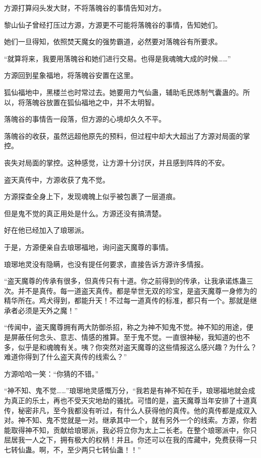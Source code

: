 \begin{this_body}
方源打算闷头发大财，不将落魄谷的事情告知对方。

黎山仙子曾经打压过方源，方源更不可能将落魄谷的事情，告知她们。

她们一旦得知，依照焚天魔女的强势霸道，必然要对落魄谷有所要求。

“就算将来，我要用落魄谷和她们进行交易。也得是我魂魄大成的时候……”

方源回到星象福地，将落魄谷安置在这里。

狐仙福地中，黑楼兰也时常过去。她要用力气仙蛊，辅助毛民炼制气囊蛊的。所以，将落魄谷放置在狐仙福地之中，并不太明智。

落魄谷的事情告一段落，但方源的心境却久久不平。

落魄谷的收获，虽然远超他原先的预料，但过程中却大大超出了方源对局面的掌控。

丧失对局面的掌控。这种感觉，让方源十分讨厌，并且感到阵阵的不安。

盗天真传中，方源收获了鬼不觉。

方源探查全身上下，发现魂魄上似乎被包裹了一层道痕。

但是鬼不觉的真正用处是什么。方源还没有搞清楚。

好在他已经加入了琅琊派。

于是，方源便亲自去琅琊福地，询问盗天魔尊的事情。

琅琊地灵没有隐瞒，也没有提任何要求，直接告诉方源许多情报。

“盗天魔尊的传承有很多，但真传只有十道。你之前得到的传承，让我承诺炼蛊三次。并不是真传。每一道盗天真传。都是举世无双的珍宝，是盗天魔尊一身修为的精华所在。鸡犬得到，都能升天！不过每一道真传的标准，都只有一个。那就是继承者必须是天外之魔！”

“传闻中，盗天魔尊拥有两大防御杀招，称之为神不知鬼不觉。神不知的用途，便是屏蔽任何念头、意志、情感的推算。至于鬼不觉。一直很神秘，我知道的也不多，似乎是和魂魄有关。咦？你突然对盗天魔尊的这些情报这么感兴趣？为什么？难道你得到了什么盗天真传的线索么？”

方源哈哈一笑：“你猜的不错。”

“神不知、鬼不觉……”琅琊地灵感慨万分，“我若是有神不知在手，琅琊福地就会成为真正的乐土，再也不受天灾地劫的骚扰。可惜的是，盗天魔尊当年安排了十道真传，秘密非凡，至今我都没有听过，有什么人获得他的真传。他的真传都是成双入对。神不知、鬼不觉就是一对。继承其中一个，就有另外一个的线索。方源，你若能取得神不知，贡献给琅琊派，我必将立你为太上二长老。在整个琅琊派中，你只屈居我一人之下，拥有极大的权柄！并且。你还可以在我的库藏中，免费获得一只七转仙蛊。啊，不，至少两只七转仙蛊！！”


\end{this_body}
